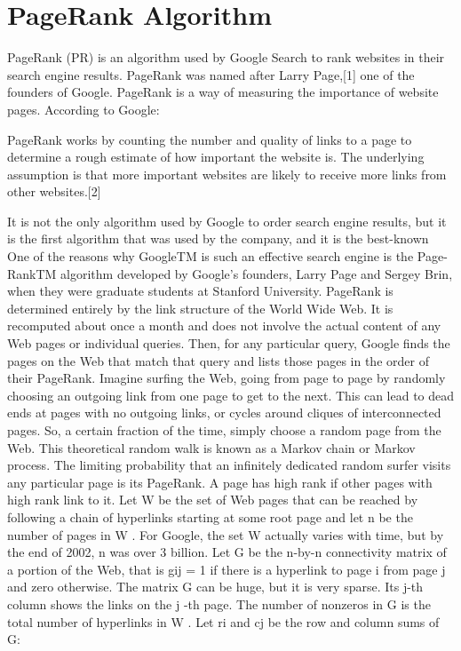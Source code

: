 \documentclass[12 pt]{article}
\begin{document}
\section{PageRank Algorithm}
PageRank (PR) is an algorithm used by Google Search to rank websites in their search engine results. PageRank was named after Larry Page,[1] one of the founders of Google. PageRank is a way of measuring the importance of website pages. According to Google:

    PageRank works by counting the number and quality of links to a page to determine a rough estimate of how important the website is. The underlying assumption is that more important websites are likely to receive more links from other websites.[2] 

It is not the only algorithm used by Google to order search engine results, but it is the first algorithm that was used by the company, and it is the best-known
One of the reasons why GoogleTM is such an effective search engine is the Page-RankTM algorithm developed by Google’s founders, Larry Page and Sergey Brin, when they were graduate students at Stanford University. PageRank is determined entirely by the link structure of the World Wide Web. It is recomputed about once a month and does not involve the actual content of any Web pages or individual queries. Then, for any particular query, Google finds the pages on the Web that match that query and lists those pages in the order of their PageRank. Imagine surfing the Web, going from page to page by randomly choosing an outgoing link from one page to get to the next. This can lead to dead ends at pages with no outgoing links, or cycles around cliques of interconnected pages. So, a certain fraction of the time, simply choose a random page from the Web. This theoretical random walk is known as a Markov chain or Markov process. The limiting probability that an infinitely dedicated random surfer visits any particular page is its PageRank. A page has high rank if other pages with high rank link to it.
Let W be the set of Web pages that can be reached by following a chain of hyperlinks starting at some root page and let n be the number of pages in W . For Google, the set W actually varies with time, but by the end of 2002, n was over 3 billion. Let G be the n-by-n connectivity matrix of a portion of the Web, that is gij = 1 if there is a hyperlink to page i from page j and zero otherwise. The matrix G can be huge, but it is very sparse. Its j-th column shows the links on the j -th page. The number of nonzeros in G is the total number of hyperlinks in W .
Let ri and cj be the row and column sums of G:
\end{document}
